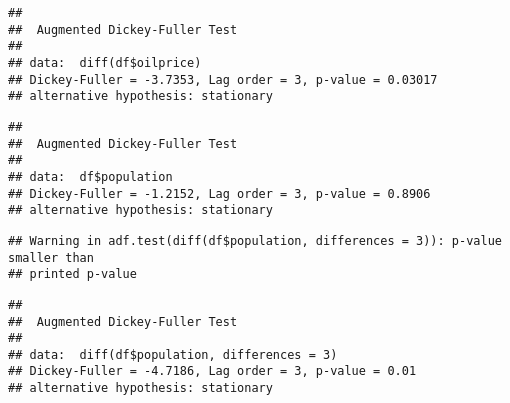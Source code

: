 \documentclass[
]{article}
\newenvironment{Shaded}{\begin{snugshade}}{\end{snugshade}}
\newcommand{\AttributeTok}[1]{\textcolor[rgb]{0.13,0.29,0.53}{#1}}
\newcommand{\CommentTok}[1]{\textcolor[rgb]{0.56,0.35,0.01}{\textit{#1}}}
\newcommand{\DecValTok}[1]{\textcolor[rgb]{0.00,0.00,0.81}{#1}}
\newcommand{\FunctionTok}[1]{\textcolor[rgb]{0.13,0.29,0.53}{\textbf{#1}}}
\newcommand{\NormalTok}[1]{#1}
\newcommand{\SpecialCharTok}[1]{\textcolor[rgb]{0.81,0.36,0.00}{\textbf{#1}}}
\begin{document}
\begin{Shaded}
\end{Shaded}

\begin{verbatim}
## 
##  Augmented Dickey-Fuller Test
## 
## data:  diff(df$oilprice)
## Dickey-Fuller = -3.7353, Lag order = 3, p-value = 0.03017
## alternative hypothesis: stationary
\end{verbatim}

\begin{Shaded}
\end{Shaded}

\begin{verbatim}
## 
##  Augmented Dickey-Fuller Test
## 
## data:  df$population
## Dickey-Fuller = -1.2152, Lag order = 3, p-value = 0.8906
## alternative hypothesis: stationary
\end{verbatim}

\begin{Shaded}
\end{Shaded}

\begin{verbatim}
## Warning in adf.test(diff(df$population, differences = 3)): p-value smaller than
## printed p-value
\end{verbatim}

\begin{verbatim}
## 
##  Augmented Dickey-Fuller Test
## 
## data:  diff(df$population, differences = 3)
## Dickey-Fuller = -4.7186, Lag order = 3, p-value = 0.01
## alternative hypothesis: stationary
\end{verbatim}
\end{document}
